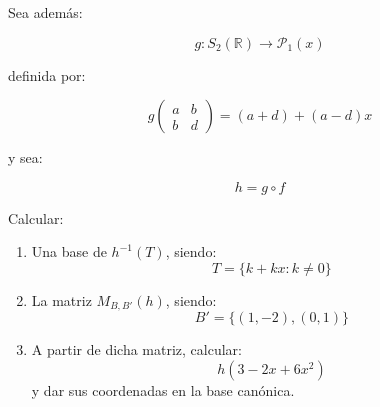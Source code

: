 \documentclass[11pt,a4paper]{article}
\newcommand{\R}{\mathbb{R}}
\begin{document}
Sea además:

\[
g:S_2(\R)\longrightarrow\mathcal{P}_1(x)
\]

definida por:

\[
g
\begin{pmatrix}
a&b\\
b&d
\end{pmatrix}
=
(a+d)+(a-d)x
\]

y sea:

\[
h=g\circ f
\]

Calcular:

\begin{enumerate}[label=\alph*),start=3]
	\item Una base de $h^{-1}(T)$, siendo:
	\[
	T=\{k+kx:k\neq0\}
	\]
	\item La matriz $M_{B,B'}(h)$, siendo:
	\[
	B'=\{(1,-2),(0,1)\}
	\]
	\item A partir de dicha matriz, calcular:
	\[
	h(3-2x+6x^2)
	\]
	y dar sus coordenadas en la base canónica.
\end{enumerate}
\end{document}

